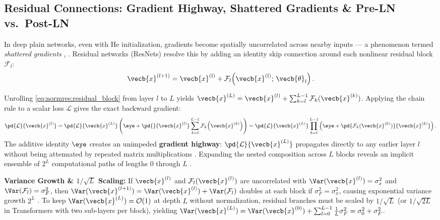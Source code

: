 \documentclass[../../../../master.tex]{subfiles}
\begin{document}
\subsection{Residual Connections: Gradient Highway, Shattered Gradients \& Pre-LN vs.\ Post-LN}
\label{sec:normres:residuals}

In deep plain networks, even with He initialization, gradients become spatially uncorrelated across nearby inputs --- a phenomenon termed \emph{shattered gradients} , . Residual networks (ResNets) resolve this by adding an identity skip connection around each nonlinear residual block $\mathcal{F}_l$:
\begin{equation}
  \vecb{x}^{(l+1)} = \vecb{x}^{(l)} + \mathcal{F}_l\!\left(\vecb{x}^{(l)};\, \vecb{\theta}_l\right).
  \label{eq:normres:residual_block}
\end{equation}

\begin{coremath}
\label{box:normres:residual_math}
Unrolling \eqref{eq:normres:residual_block} from layer $l$ to $L$ yields $\vecb{x}^{(L)} = \vecb{x}^{(l)} + \sum_{k=l}^{L-1} \mathcal{F}_k(\vecb{x}^{(k)})$. Applying the chain rule to a scalar loss $\mathcal{L}$ gives the exact backward gradient:
\begin{equation}
  \pd{\mathcal{L}}{\vecb{x}^{(l)}}
  = \pd{\mathcal{L}}{\vecb{x}^{(L)}} \left( \eye + \pd{}{\vecb{x}^{(l)}} \sum_{k=l}^{L-1} \mathcal{F}_k\!\left(\vecb{x}^{(k)}\right) \right)
  = \pd{\mathcal{L}}{\vecb{x}^{(L)}} \prod_{k=l}^{L-1} \left( \eye + \pd{\mathcal{F}_k(\vecb{x}^{(k)})}{\vecb{x}^{(k)}} \right).
  \label{eq:normres:residual_jacobian}
\end{equation}
The additive identity $\eye$ creates an unimpeded \textbf{gradient highway}: $\pd{\mathcal{L}}{\vecb{x}^{(L)}}$ propagates directly to any earlier layer $l$ without being attenuated by repeated matrix multiplications . Expanding the nested composition across $L$ blocks reveals an implicit ensemble of $2^L$ computational paths of lengths $0$ through $L$ .

\textbf{Variance Growth \& $1/\sqrt{L}$ Scaling:} If $\vecb{x}^{(l)}$ and $\mathcal{F}_l(\vecb{x}^{(l)})$ are uncorrelated with $\Var(\vecb{x}^{(l)}) = \sigma_x^2$ and $\Var(\mathcal{F}_l) = \sigma_F^2$, then $\Var(\vecb{x}^{(l+1)}) = \Var(\vecb{x}^{(l)}) + \Var(\mathcal{F}_l)$ doubles at each block if $\sigma_F^2 = \sigma_x^2$, causing exponential variance growth $2^L$ . To keep $\Var(\vecb{x}^{(L)}) = \mathcal{O}(1)$ at depth $L$ without normalization, residual branches must be scaled by $1/\sqrt{L}$ (or $1/\sqrt{2L}$ in Transformers with two sub-layers per block), yielding $\Var(\vecb{x}^{(L)}) = \Var(\vecb{x}^{(0)}) + \sum_{l=0}^{L-1} \frac{1}{L}\sigma_F^2 = \sigma_0^2 + \sigma_F^2$.
\end{coremath}
\end{document}
